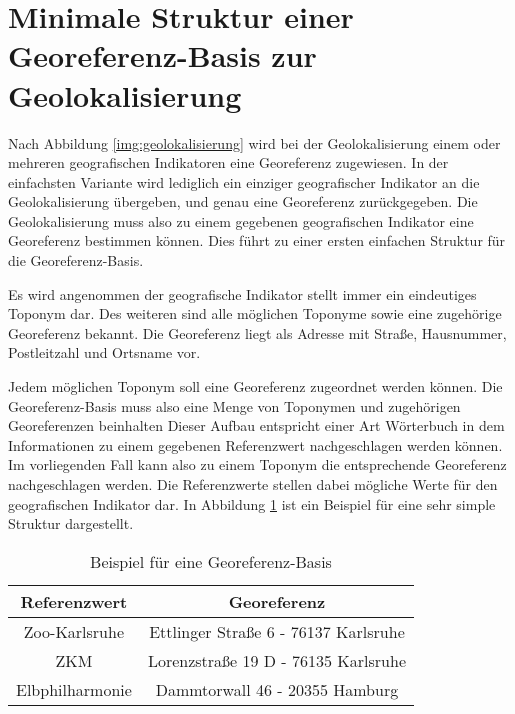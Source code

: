 	\section{Minimale Struktur einer Georeferenz-Basis zur Geolokalisierung} \label{sec:generelleStruktur} 
		
		Nach Abbildung \ref{img:geolokalisierung} wird bei der Geolokalisierung einem oder mehreren geografischen Indikatoren eine Georeferenz zugewiesen.
		In der einfachsten Variante wird lediglich ein einziger geografischer Indikator an die Geolokalisierung übergeben, und genau eine Georeferenz zurückgegeben.
		Die Geolokalisierung muss also zu einem gegebenen geografischen Indikator eine Georeferenz bestimmen können.
		Dies führt zu einer ersten einfachen Struktur für die Georeferenz-Basis.	

		Es wird angenommen der geografische Indikator stellt immer ein eindeutiges Toponym dar.
		Des weiteren sind alle möglichen Toponyme sowie eine zugehörige Georeferenz bekannt. 
		Die Georeferenz liegt als Adresse mit Straße, Hausnummer, Postleitzahl und Ortsname vor.

		Jedem möglichen Toponym soll eine Georeferenz zugeordnet werden können. 
		Die Georeferenz-Basis muss also eine Menge von Toponymen und zugehörigen Georeferenzen beinhalten
		Dieser Aufbau entspricht einer Art Wörterbuch in dem Informationen zu einem gegebenen Referenzwert nachgeschlagen werden können.
		Im vorliegenden Fall kann also zu einem Toponym die entsprechende Georeferenz nachgeschlagen werden.
		Die Referenzwerte stellen dabei mögliche Werte für den geografischen Indikator dar. 
		In Abbildung \ref{tab:simpleStruktur} ist ein Beispiel für eine sehr simple Struktur dargestellt.

		\begin{table}[htpb]
				\caption{Beispiel für eine Georeferenz-Basis} 
				\centering
				\begin{tabular}{|c||c|}
					\hline
					Referenzwert & Georeferenz \\
					\hline\hline
					Zoo-Karlsruhe & Ettlinger Straße 6 - 76137 Karlsruhe \\
					\hline
					ZKM & Lorenzstraße 19 D - 76135 Karlsruhe \\
					\hline
					Elbphilharmonie & Dammtorwall 46 - 20355 Hamburg \\
					\hline
				\end{tabular}
				\label{tab:simpleStruktur} 
		\end{table} 

